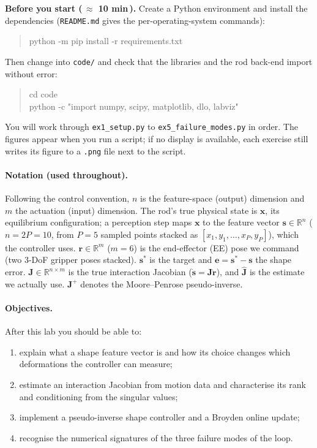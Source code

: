\documentclass[11pt,a4paper]{article}
\begin{document}
\begin{checkbox}
\textbf{Before you start (\,$\approx$ 10 min\,).} Create a Python environment and
install the dependencies (\texttt{README.md} gives the per-operating-system
commands):
\begin{quote}\small\ttfamily
python -m pip install -r requirements.txt
\end{quote}
Then change into \texttt{code/} and check that the libraries and the rod back-end
import without error:
\begin{quote}\small\ttfamily
cd code\\
python -c "import numpy, scipy, matplotlib, dlo, labviz"
\end{quote}
You will work through \texttt{ex1\_setup.py} to \texttt{ex5\_failure\_modes.py} in order.
The figures appear when you run a script; if no display is available, each exercise still
writes its figure to a \texttt{.png} file next to the script.
\end{checkbox}

\paragraph{Notation (used throughout).}
Following the control convention, $n$ is the feature-space (output) dimension and $m$ the
actuation (input) dimension. The rod's true physical state is $\mathbf{x}$, its equilibrium configuration; a
perception step maps $\mathbf{x}$ to the feature vector $\mathbf{s}\in\mathbb{R}^{n}$ ($n=2P=10$, from $P=5$ sampled
points stacked as $[x_1,y_1,\dots,x_P,y_P]$), which the controller uses.
$\mathbf{r}\in\mathbb{R}^{m}$ ($m=6$) is the end-effector (EE) pose we command (two 3-DoF gripper
poses stacked). $\mathbf{s}^{*}$ is the target and $\mathbf{e}=\mathbf{s}^{*}-\mathbf{s}$ the shape error.
$\mathbf{J}\in\mathbb{R}^{n\times m}$ is the true interaction Jacobian ($\dot{\mathbf{s}} = \mathbf{J}\dot{\mathbf{r}}$), and
$\hat{\mathbf{J}}$ is the estimate we actually use. $\mathbf{J}^{+}$ denotes the Moore--Penrose pseudo-inverse.

\paragraph{Objectives.} After this lab you should be able to:
\begin{enumerate}[label=(\alph*)]
    \item explain what a shape feature vector is and how its choice changes which
    deformations the controller can measure;
    \item estimate an interaction Jacobian from motion data and characterise its
    rank and conditioning from the singular values;
    \item implement a pseudo-inverse shape controller and a Broyden online
    update;
    \item recognise the numerical signatures of the three failure modes of the
    loop.
\end{enumerate}
\end{document}
